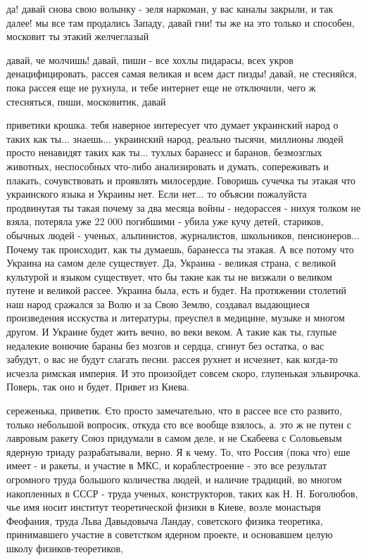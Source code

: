 да! давай снова свою волынку - зеля наркоман, у вас каналы закрыли, и так
далее! мы все там продались Западу, давай гни! ты же на это только и способен,
московит ты этакий желчеглазый

давай, че молчишь! давай, пиши - все хохлы пидарасы, всех укров
денацифицировать, рассея самая великая и всем даст пизды! давай, не стесняйся,
пока рассея еще не рухнула, и тебе интернет еще не отключили, чего ж
стесняться, пиши, московитик, давай

приветики крошка. тебя наверное интересует что думает украинский народ о таких
как ты... знаешь... украинский народ, реально тысячи, миллионы людей просто
ненавидят таких как ты... тухлых баранесс и баранов, безмозглых животных,
неспособных что-либо анализировать и думать, сопереживать и плакать,
сочувствовать и проявлять милосердие. Говоришь сучечка ты этакая что
украинского языка и Украины нет. Если нет... то объясни пожалуйста продвинутая
ты такая почему за два месяца войны - недорассея - нихуя толком не взяла,
потеряла уже 22 000 погибшими - убила уже кучу детей, стариков, обычных людей -
ученых, альпинистов, журналистов, школьников, пенсионеров... Почему так
происходит, как ты думаешь, баранесса ты этакая. А все потому что Украина на
самом деле существует. Да, Украина - великая страна, с великой культурой и
языком существует, что бы такие как ты не визжали о великом путене и великой
рассее. Украина была, есть и будет. На протяжении столетий наш народ сражался
за Волю и за Свою Землю, создавал выдающиеся произведения исскуства и
литературы, преуспел в медицине, музыке и многом другом. И Украине будет жить
вечно, во веки веком. А такие как ты, глупые недалекие вонючие бараны без
мозгов и сердца, сгинут без остатка, о вас забудут, о вас не будут слагать
песни. рассея рухнет и исчезнет, как когда-то исчезла римская империя. И это
произойдет совсем скоро, глупенькая эльвирочка. Поверь, так оно и будет. Привет
из Киева.

сереженька, приветик. Єто просто замечательно, что в рассее все єто 
развито, только небольшой вопросик, откуда єто все вообще взялось, а. 
это ж не путен с лавровым ракету Союз придумали в самом деле, и не 
Скабеева с Соловьевым ядерную триаду разрабатывали, верно. Я к чему. То,
 что Россия (пока что) еше имеет - и ракеты, и участие в МКС, и 
кораблестроение - это все результат огромного труда большого количества 
людей, и наличие традиций, во многом накопленных в СССР - труда ученых, 
конструкторов, таких как Н. Н. Боголюбов, чье имя носит институт 
теоретической физики в Киеве, возле монастыря Феофания, труда Льва 
Давыдовыча Ландау, советского физика теоретика, принимавшего участие в 
советстком ядерном проекте, и основавшем целую школу физиков-теоретиков,

